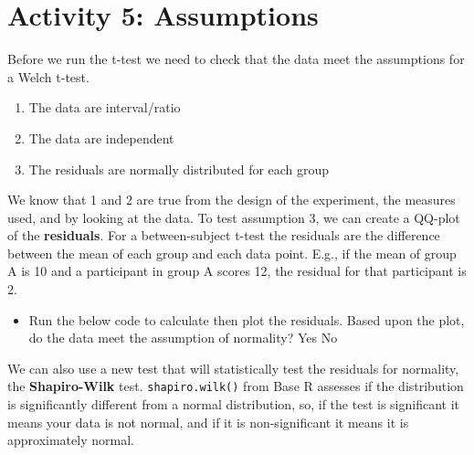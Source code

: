 \documentclass[]{book}
\newenvironment{Shaded}{\begin{snugshade}}{\end{snugshade}}
\newcommand{\DataTypeTok}[1]{\textcolor[rgb]{0.13,0.29,0.53}{#1}}
\newcommand{\KeywordTok}[1]{\textcolor[rgb]{0.13,0.29,0.53}{\textbf{#1}}}
\newcommand{\NormalTok}[1]{#1}
\newcommand{\OperatorTok}[1]{\textcolor[rgb]{0.81,0.36,0.00}{\textbf{#1}}}
\newcommand{\StringTok}[1]{\textcolor[rgb]{0.31,0.60,0.02}{#1}}
\providecommand{\tightlist}{%
  \setlength{\itemsep}{0pt}\setlength{\parskip}{0pt}}
\begin{document}
\hypertarget{activity-5-assumptions}{%
\section{Activity 5: Assumptions}\label{activity-5-assumptions}}

Before we run the t-test we need to check that the data meet the assumptions for a Welch t-test.

\begin{enumerate}
\def\labelenumi{\arabic{enumi}.}
\tightlist
\item
  The data are interval/ratio
\item
  The data are independent
\item
  The residuals are normally distributed for each group
\end{enumerate}

We know that 1 and 2 are true from the design of the experiment, the measures used, and by looking at the data. To test assumption 3, we can create a QQ-plot of the \textbf{residuals}. For a between-subject t-test the residuals are the difference between the mean of each group and each data point. E.g., if the mean of group A is 10 and a participant in group A scores 12, the residual for that participant is 2.

\begin{itemize}
\tightlist
\item
  Run the below code to calculate then plot the residuals. Based upon the plot, do the data meet the assumption of normality? Yes No
\end{itemize}

\begin{Shaded}
\end{Shaded}

We can also use a new test that will statistically test the residuals for normality, the \textbf{Shapiro-Wilk} test. \texttt{shapiro.wilk()} from Base R assesses if the distribution is significantly different from a normal distribution, so, if the test is significant it means your data is not normal, and if it is non-significant it means it is approximately normal.
\end{document}
